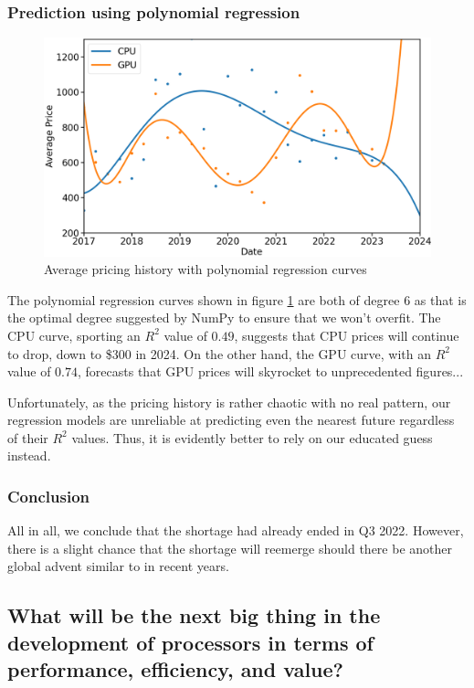\documentclass[conference]{IEEEtran}
\begin{document}
\subsubsection{Prediction using polynomial regression}
\begin{figure}[htbp]
	\centerline{\includegraphics[width=\columnwidth]{avg_price_reg.png}}
	\caption{Average pricing history with polynomial regression curves}
	\label{fig4}
\end{figure}
The polynomial regression curves shown in figure \ref{fig4} are both of degree
6 as that is the optimal degree suggested by NumPy to ensure that we won’t
overfit. The CPU curve, sporting an $R^{2}$ value of $0.49$, suggests that
CPU prices will continue to drop, down to \$300 in 2024. On the other hand,
the GPU curve, with an $R^{2}$ value of $0.74$, forecasts that GPU prices will
skyrocket to unprecedented figures...

Unfortunately, as the pricing history is rather chaotic with no real pattern,
our regression models are unreliable at predicting even the nearest future
regardless of their $R^{2}$ values. Thus, it is evidently better to rely
on our educated guess instead.

\subsubsection{Conclusion}
All in all, we conclude that the shortage had already ended in Q3 2022.
However, there is a slight chance that the shortage will reemerge should
there be another global advent similar to in recent years.

\subsection{What will be the next big thing in the development of
	processors in terms of performance, efficiency, and value?}
\end{document}
